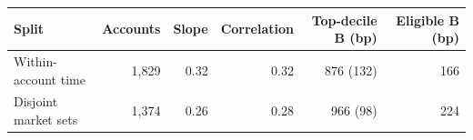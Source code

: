\begin{tabular}{lrrrrr}
\toprule
Split & Accounts & Slope & Correlation & Top-decile B (bp) & Eligible B (bp) \\
\midrule
Within-account time & 1,829 & 0.32 & 0.32 & 876 (132) & 166 \\
Disjoint market sets & 1,374 & 0.26 & 0.28 & 966 (98) & 224 \\
\bottomrule
\end{tabular}

